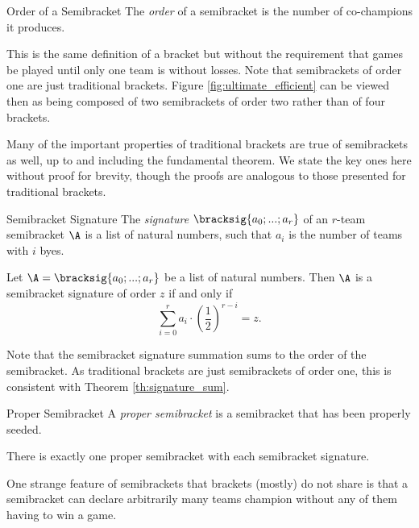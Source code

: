 {    \begin{definition}{Order of a Semibracket}{}
        The \textit{order} of a semibracket is the number of co-champions it produces.
    \end{definition}

    This is the same definition of a bracket but without the requirement that games be played until only one team is without losses. Note that semibrackets of order one are just traditional brackets. Figure \ref{fig:ultimate_efficient} can be viewed then as being composed of two semibrackets of order two rather than of four brackets.
    
    Many of the important properties of traditional brackets are true of semibrackets as well, up to and including the fundamental theorem. We state the key ones here without proof for brevity, though the proofs are analogous to those presented for traditional brackets.

    \begin{definition}{Semibracket Signature}{}
        The \textit{signature} $\bracksig{a_0; ...; a_r}$ of an $r$-team semibracket $\A$ is a list of natural numbers, such that $a_i$ is the number of teams with $i$ byes.
    \end{definition}

    \begin{theorem}{}{}
        Let $\A = \bracksig{a_0; ...; a_r}$ be a list of natural numbers. Then $\A$ is a semibracket signature of order $z$ if and only if $$\sum_{i=0}^r a_i \cdot \left(\frac{1}{2}\right)^{r - i} = z.$$
    \end{theorem}

    Note that the semibracket signature summation sums to the order of the semibracket. As traditional brackets are just semibrackets of order one, this is consistent with Theorem \ref{th:signature_sum}.

    \begin{definition}{Proper Semibracket}{}
        A \textit{proper semibracket} is a semibracket that has been properly seeded.
    \end{definition}

    \begin{theorem}{}{}
        There is exactly one proper semibracket with each semibracket signature.
    \end{theorem}

    One strange feature of semibrackets that brackets (mostly) do not share is that a semibracket can declare arbitrarily many teams champion without any of them having to win a game.

}
